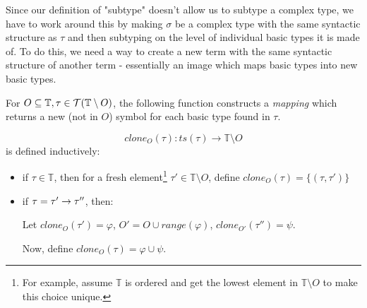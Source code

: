 \documentclass[main.tex]{subfiles}
\begin{document}
Since our definition of "subtype" doesn't allow us to subtype a complex type,
we have to work around this by making $\sigma$ be a complex type with the same
syntactic structure as $\tau$ and then subtyping on the level of individual
basic types it is made of. To do this, we need a way to create a new term
with the same syntactic structure of another term - essentially an image which
maps basic types into new basic types.


\begin{defn}
    For $O \subseteq \mathbb{T}, \tau \in \mathcal{T}( \mathbb{T} \setminus O )$,
    the following function constructs a \emph{mapping} which returns a new (not
    in $O$) symbol for each basic type found in $\tau$.

    \[ clone_O(\tau) : ts(\tau) \rightarrow \mathbb{T} \setminus O \]
    is defined inductively:
    \begin{itemize}
        \item if $\tau \in \mathbb{T}$, then for a fresh element\footnote{
            For example, assume $\mathbb{T}$ is ordered and get the lowest element
            in $\mathbb{T} \setminus O$ to make this choice unique.}
            $\tau' \in \mathbb{T} \setminus O$, define
            $clone_O(\tau) = \{ (\tau, \tau') \}$
        \item if $\tau = \tau' \rightarrow \tau''$, then:

            Let $clone_O(\tau') = \varphi$, $O' = O \cup range(\varphi)$,
            $clone_{O'}(\tau'') = \psi$.

            Now, define $clone_O(\tau) = \varphi \cup \psi$.
    \end{itemize}
\end{defn}
\end{document}
